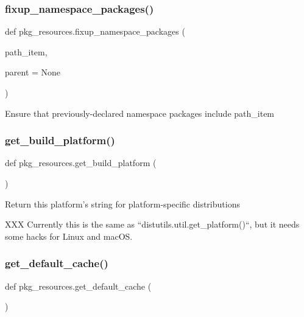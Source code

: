 \subsubsection{\texorpdfstring{fixup\+\_\+namespace\+\_\+packages()}{fixup\_namespace\_packages()}}
{\footnotesize\ttfamily def pkg\+\_\+resources.\+fixup\+\_\+namespace\+\_\+packages (\begin{DoxyParamCaption}\item[{}]{path\+\_\+item,  }\item[{}]{parent = {\ttfamily None} }\end{DoxyParamCaption})}

\begin{DoxyVerb}Ensure that previously-declared namespace packages include path_item\end{DoxyVerb}
 \mbox{\label{namespacepkg__resources_a428a5468ed29d9fc3a2c9c7b3c69d4d8}} 
\subsubsection{\texorpdfstring{get\+\_\+build\+\_\+platform()}{get\_build\_platform()}}
{\footnotesize\ttfamily def pkg\+\_\+resources.\+get\+\_\+build\+\_\+platform (\begin{DoxyParamCaption}{ }\end{DoxyParamCaption})}

\begin{DoxyVerb}Return this platform's string for platform-specific distributions

XXX Currently this is the same as ``distutils.util.get_platform()``, but it
needs some hacks for Linux and macOS.
\end{DoxyVerb}
 \mbox{\label{namespacepkg__resources_a605d91f78bde46cd2f7db04c78b9c28c}} 
\subsubsection{\texorpdfstring{get\+\_\+default\+\_\+cache()}{get\_default\_cache()}}
{\footnotesize\ttfamily def pkg\+\_\+resources.\+get\+\_\+default\+\_\+cache (\begin{DoxyParamCaption}{ }\end{DoxyParamCaption})}

